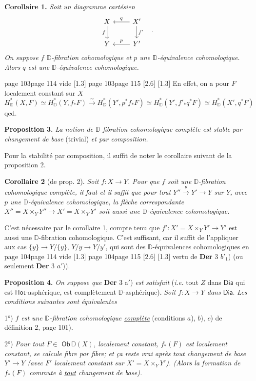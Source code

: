 \documentclass[11pt,leqno]{article}
\newcommand{\printedpage}[1]{\marginnote{\scriptsize\sffamily ed.\ #1}}
\newcommand{\msp}[1]{%
  \begingroup\def\thismsp{#1}\def\blankmsp{page 114 vide}%
  \ifx\thismsp\blankmsp
    \marginnote{\scriptsize\sffamily [114: vide]}[1.3\baselineskip]%
  \else\def\followingmsp{page 115}%
    \ifx\thismsp\followingmsp
      \marginnote{\scriptsize\sffamily [page 115]}[2.6\baselineskip]%
    \else\marginnote{\scriptsize\sffamily [#1]}[1.3\baselineskip]\fi
  \fi\endgroup}
\newcommand{\DD}{\ensuremath{\mathbb{D}}}
\newcommand{\Dia}{\ensuremath{\mathsf{Dia}}}
\newcommand{\Ob}{\ensuremath{\mathsf{Ob}}}
\newcommand{\Hot}{\ensuremath{\mathsf{Hot}}}
\begin{document}
\textbf{Corollaire 1.} \textit{Soit un diagramme cartésien}
\[
\begin{tikzcd}
X & X' \arrow[l, "q"'] \arrow[d, "f'"] \\
Y & Y' \arrow[l, "p"']
\arrow[from=1-1, to=2-1, "f"']
\end{tikzcd}
\quad .
\]
\textit{On suppose $f$ $\DD$-fibration cohomologique et $p$ une $\DD$-équivalence cohomologique. Alors $q$ est une $\DD$-équivalence cohomologique.}

\msp{page 103}
En effet, on a pour $F$ localement constant sur $X$
\[
H^*_{\DD}(X,F) \simeq H^*_{\DD}(Y, f_*F) \overset{\sim}{\longrightarrow} H^*_{\DD}(Y', p^*f_*F) \simeq H^*_{\DD}(Y', f'_*q^*F) \simeq H^*_{\DD}(X', q^*F)
\]
qed.

\textbf{Proposition 3.} \textit{La notion de $\DD$-fibration cohomologique complète est stable par changement de base} (trivial) \textit{et par composition.}

Pour la stabilité par composition, il suffit de noter le corollaire suivant de la proposition 2.

\textbf{Corollaire 2} (de prop. 2). \textit{Soit $f : X \to Y$. Pour que $f$ soit une $\DD$-fibration cohomologique complète, il faut et il suffit que pour tout $Y'' \overset{p}{\to} Y' \to Y$ sur $Y$, avec $p$ une $\DD$-équivalence cohomologique, la flèche correspondante $X'' = X \times_Y Y'' \longrightarrow X' = X \times_Y Y'$ soit aussi une $\DD$-équivalence cohomologique.}

C’est nécessaire par le corollaire 1, compte tenu que $f' : X' = X \times_Y Y' \to Y'$ est aussi une $\DD$-fibration cohomologique. C’est suffisant, car il suffit de l’appliquer aux cas $\{y\} \to Y/\{y\}$, $Y/y \to Y/y'$, qui sont des $\DD$-équivalences cohomologiques en
\msp{page 104}
vertu de \textbf{Der} 3 $b'_1$) (ou seulement \textbf{Der} 3 $a'$)).

\printedpage{63}

\textbf{Proposition 4.} \textit{On suppose que} \textbf{Der} 3 a$'$) \textit{est satisfait} (\textit{i.e.} tout $Z$ dans \Dia{} qui est \Hot-asphérique, est complètement $\DD$-asphérique). \textit{Soit $f : X \to Y$ dans} \Dia. \textit{Les conditions suivantes sont équivalentes}

1°) \textit{$f$ est une $\DD$-fibration cohomologique \underline{complète}} (conditions $a$), $b$), $c$) de définition 2, page 101).

2°) \textit{Pour tout $F \in$} \Ob\,$\DD(X)$\textit{, localement constant, $f_*(F)$ est localement constant, se calcule fibre par fibre; et ça reste vrai après tout changement de base $Y' \to Y$ (avec $F'$ localement constant sur $X' = X \times_Y Y'$). (Alors la formation de $f_*(F)$ commute à \underline{tout} changement de base).}
\end{document}
